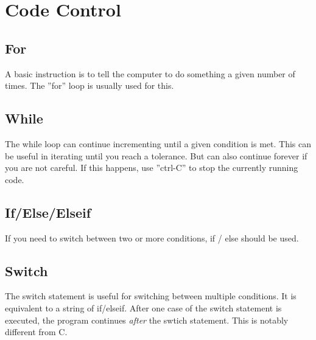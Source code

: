
\pagebreak
\section{Code Control}

\subsection{For}
A basic instruction is to tell the computer to do something a given number of times.
 The ''for'' loop is usually used for this.

\begin{quote}

\end{quote}
\noindent

\pagebreak
\subsection{While}
The while loop can continue incrementing until a given condition is met.
 This can be useful in iterating until you reach a tolerance.
 But can also continue forever if you are not careful.
 If this happens, use ''ctrl-C'' to stop the currently running code.

\begin{quote}

\end{quote}

\pagebreak
\subsection{If/Else/Elseif}
If you need to switch between two or more conditions, if / else should be used.

\begin{quote}

\end{quote}

\pagebreak
\subsection{Switch}
The switch statement is useful for switching between multiple conditions.
 It is equivalent to a string of if/elseif.
 After one case of the switch statement is executed, the program continues \emph{after} the swtich statement.
 This is notably different from C.

\begin{quote}

\end{quote}

